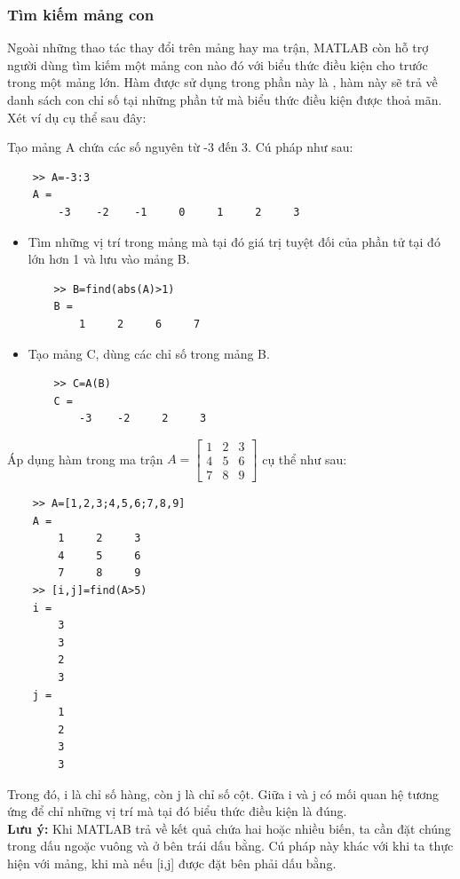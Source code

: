 \documentclass[12pt,a4paper]{article}
\begin{document}
\subsubsection{Tìm kiếm mảng con}
Ngoài những thao tác thay đổi trên mảng hay ma trận, MATLAB còn hỗ trợ người dùng tìm kiếm một mảng con nào đó với biểu thức điều kiện cho trước trong một mảng lớn. Hàm được sử dụng trong phần này là , hàm này sẽ trả về danh sách con chỉ số tại những phần tử mà biểu thức điều kiện được thoả mãn. Xét ví dụ cụ thể sau đây:
\begin{example}
Tạo mảng A chứa các số nguyên từ -3 đến 3. Cú pháp như sau:
\begin{lstlisting}
	>> A=-3:3
	A =
    	-3    -2    -1     0     1     2     3
\end{lstlisting}
\begin{itemize}
	\item Tìm những vị trí trong mảng mà tại đó giá trị tuyệt đối của phần tử tại đó lớn hơn 1 và lưu vào mảng B.
\begin{lstlisting}
	>> B=find(abs(A)>1)
	B =
     	1     2     6     7
\end{lstlisting}
	\item Tạo mảng C, dùng các chỉ số trong mảng B.
\begin{lstlisting}
	>> C=A(B)
	C =
    	-3    -2     2     3
\end{lstlisting}
\end{itemize}
Áp dụng hàm  trong ma trận $A=\begin{bmatrix} 1 & 2 & 3 \\ 4 & 5 & 6 \\ 7 & 8 & 9 \end{bmatrix}$ cụ thể như sau:
\begin{lstlisting}
	>> A=[1,2,3;4,5,6;7,8,9]
	A =
     	1     2     3
     	4     5     6
     	7     8     9
	>> [i,j]=find(A>5)
	i =
     	3
     	3
     	2
     	3
	j =
     	1
     	2
     	3
     	3
\end{lstlisting}
Trong đó, i là chỉ số hàng, còn j là chỉ số cột. Giữa i và j có mối quan hệ tương ứng để chỉ những vị trí mà tại đó biểu thức điều kiện là đúng.\\
\textbf{Lưu ý:} Khi MATLAB trả về kết quả chứa hai hoặc nhiều biến, ta cần đặt chúng trong dấu ngoặc vuông và ở bên trái dấu bằng. Cú pháp này khác với khi ta thực hiện với mảng, khi mà nếu [i,j] được đặt bên phải dấu bằng. 
\end{example}
\end{document}
